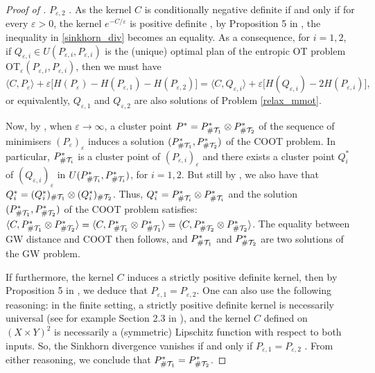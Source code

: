 \begin{proof}[Proof of ]
$P_{\varepsilon, 2}$ \citep{Ramdas17}. As the kernel $C$ is conditionally negative definite if and only if for every
$\varepsilon > 0$, the kernel $e^{-C / \varepsilon}$ is positive definite \citep{Schoenberg38}, by Proposition 5 in \citep{Janati20},
the inequality in \ref{sinkhorn_div} becomes an equality. As a consequence, for $i=1,2$, if
$Q_{\varepsilon, i} \in U( P_{\varepsilon, i}, P_{\varepsilon, i})$ is the (unique) optimal plan of the entropic OT problem
$\text{OT}_{\varepsilon}(P_{\varepsilon, i}, P_{\varepsilon, i})$, then we must have
\begin{equation}
  \langle C, P_{\varepsilon} \rangle + \varepsilon \big[ H(P_{\varepsilon}) - H(P_{\varepsilon, 1}) -
  H(P_{\varepsilon, 2}) \big] =
  \langle C, Q_{\varepsilon, i} \rangle + \varepsilon \big[ H(Q_{\varepsilon, i}) - 2 H(P_{\varepsilon, i}) \big],
\end{equation}
or equivalently, $Q_{\varepsilon, 1}$ and $Q_{\varepsilon, 2}$ are also solutions of Problem \eqref{relax_mmot}.

Now, by , when $\varepsilon \to \infty$, a cluster point
$P^* = P^*_{\# \mathcal T_1} \otimes P^*_{\# \mathcal T_2}$ of the sequence of minimisers $(P_{\varepsilon})_{\varepsilon}$ induces a solution
$(P^*_{\# \mathcal T_1}, P^*_{\# \mathcal T_2})$ of the COOT problem. In particular, $P^*_{\# \mathcal T_i}$ is a cluster point of
$(P_{\varepsilon, i})_{\varepsilon}$ and there exists a cluster point $Q^*_i$ of
$(Q_{\varepsilon, i})_{\varepsilon}$ in $U(P^*_{\# \mathcal T_i}, P^*_{\# \mathcal T_i})$, for $i=1,2$. But still by
, we also have that $Q^*_i = (Q^*_i)_{\# \mathcal T_1} \otimes (Q^*_i)_{\# \mathcal T_2}$. Thus,
$Q^*_i = P^*_{\# \mathcal T_i} \otimes P^*_{\# \mathcal T_i}$
and the solution $(P^*_{\# \mathcal T_1}, P^*_{\# \mathcal T_2})$ of the COOT problem satisfies:
$\langle C, P^*_{\# \mathcal T_1} \otimes P^*_{\# \mathcal T_2} \rangle =
\langle C, P^*_{\# \mathcal T_1} \otimes P^*_{\# \mathcal T_1} \rangle =
\langle C, P^*_{\# \mathcal T_2} \otimes P^*_{\# \mathcal T_2} \rangle$. The equality between GW distance and COOT then follows,
and $P^*_{\# \mathcal T_1}$ and $P^*_{\# \mathcal T_2}$ are two solutions of the GW problem.

If furthermore, the kernel $C$ induces a strictly positive definite kernel, then by Proposition 5 in \citep{Janati20},
we deduce that $P_{\varepsilon, 1} = P_{\varepsilon, 2}$. One can also use the following reasoning:
in the finite setting, a strictly positive definite kernel is necessarily universal (see for example Section 2.3 in
\citep{Borgwardt06}), and the kernel $C$ defined on $(X \times Y)^2$ is necessarily a (symmetric)
Lipschitz function with respect to both inputs. So, the Sinkhorn divergence vanishes if and only if
$P_{\varepsilon, 1} = P_{\varepsilon, 2}$ \citep{Feydy19}. From either reasoning, we conclude that
$P^*_{\# \mathcal T_1} = P^*_{\# \mathcal T_2}$.
\end{proof}

